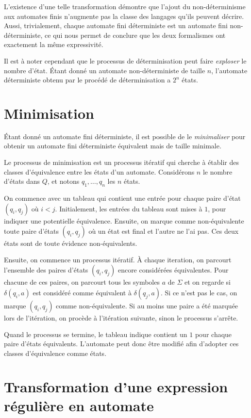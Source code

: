 L'existence d'une telle transformation démontre que l'ajout du non-déterminisme aux automates finis n'augmente pas la classe des langages qu'ils peuvent décrire. Aussi, trivialement, chaque automate fini déterministe est un automate fini non-déterministe, ce qui nous permet de conclure que les deux formalismes ont exactement la même expressivité.

Il est à noter cependant que le processus de déterminisation peut faire \textit{exploser} le nombre d'état.
Étant donné un automate non-déterministe de taille $n$, l'automate déterministe obtenu par le procédé de déterminisation a $2^n$ états.

\section{Minimisation}

Étant donné un automate fini déterministe, il est possible de le \og \textit{minimaliser} \fg{} pour obtenir un automate fini déterministe équivalent mais de taille minimale.

Le processus de minimisation est un processus itératif qui cherche à établir des classes d'équivalence entre les états d'un automate.
Considérons $n$ le nombre d'états dans $Q$, et notons $q_1, \dots, q_n$ les $n$ états.

On commence avec un tableau qui contient une entrée pour chaque paire d'état $(q_i, q_j)$ où $i < j$.
Initialement, les entrées du tableau sont mises à $1$, pour indiquer une potentielle équivalence.
Ensuite, on marque comme non-équivalente toute paire d'états $(q_i, q_j)$ où un état est final et l'autre ne l'ai pas.
Ces deux états sont de toute évidence non-équivalents.

Ensuite, on commence un processus itératif. À chaque iteration, on parcourt l'ensemble des paires d'états $(q_i, q_j)$ encore considérées équivalentes.
Pour chacune de ces paires, on parcourt tous les symboles $a$ de $\Sigma$ et on regarde si $\delta(q_i, a)$ est considéré comme équivalent à $\delta(q_j, a)$.
Si ce n'est pas le cas, on marque $(q_i, q_j)$ comme non-équivalente.
Si au moins une paire a été marquée lors de l'itération, on procède à l'itération suivante, sinon le processus s'arrête.

Quand le processus se termine, le tableau indique contient un $1$ pour chaque paire d'états équivalents.
L'automate peut donc être modifié afin d'adopter ces classes d'équivalence comme états.

\section{Transformation d'une expression régulière en automate}

